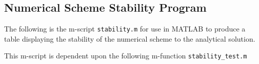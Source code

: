 \documentclass{article}
\begin{document}
\begin{appendices}
  \section{Numerical Scheme Stability Program}\label{append_stability}
  The following is the m-script \texttt{stability.m} for use in MATLAB to
  produce a table displaying the stability of the numerical scheme to the analytical
  solution.
  

  This m-script is dependent upon the following m-function \texttt{stability\_test.m}
  
\end{appendices}
\end{document}
